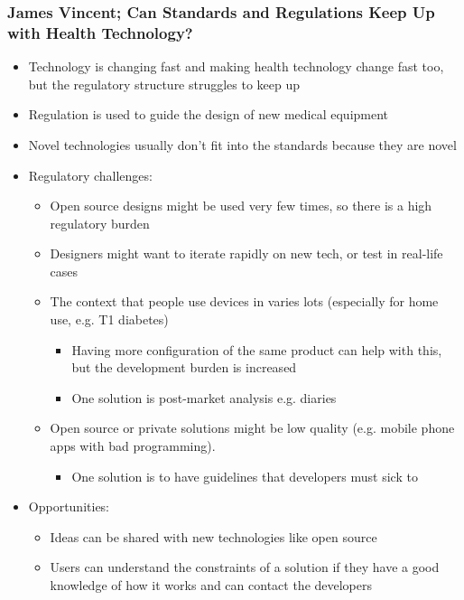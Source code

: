 \documentclass[11pt]{article}
\begin{document}
\subsubsection{James Vincent; Can Standards and Regulations Keep Up with Health Technology?}
\label{sec:org1c3711f}
\begin{itemize}
\item Technology is changing fast and making health technology change fast too, but
the regulatory structure struggles to keep up
\item Regulation is used to guide the design of new medical equipment
\item Novel technologies usually don't fit into the standards because they are novel
\item Regulatory challenges:
\begin{itemize}
\item Open source designs might be used very few times, so there is a high
regulatory burden
\item Designers might want to iterate rapidly on new tech, or test in real-life cases
\item The context that people use devices in varies lots (especially for home use,
e.g. T1 diabetes)
\begin{itemize}
\item Having more configuration of the same product can help with this, but the
development burden is increased
\item One solution is post-market analysis e.g. diaries
\end{itemize}
\item Open source or private solutions might be low quality (e.g. mobile phone
apps with bad programming).
\begin{itemize}
\item One solution is to have guidelines that developers must sick to
\end{itemize}
\end{itemize}
\item Opportunities:
\begin{itemize}
\item Ideas can be shared with new technologies like open source
\item Users can understand the constraints of a solution if they have a good
knowledge of how it works and can contact the developers
\end{itemize}
\end{itemize}
\end{document}
